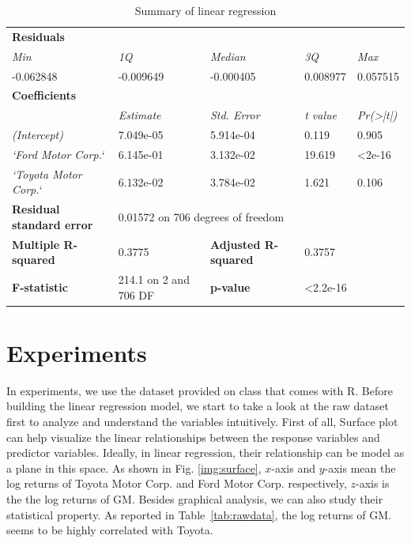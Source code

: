 \begin{table}[t]
\centering
\caption{Summary of linear regression}
\label{tab:lr}
\begin{tabular}{lllll}
\hline
\multicolumn{5}{l}{\textbf{Residuals}} \\
\textit{Min} & \textit{1Q} & \textit{Median} & \textit{3Q} & \textit{Max} \\
-0.062848 & -0.009649 & -0.000405 & 0.008977 & 0.057515 \\ \hline
\multicolumn{5}{l}{\textbf{Coefficients}} \\
 & \textit{Estimate} & \textit{Std. Error} & \textit{t value} & \textit{Pr(\textgreater|t|)} \\
\textit{(Intercept)} & 7.049e-05 & 5.914e-04 & 0.119 & 0.905 \\
\textit{`Ford Motor Corp.`} & 6.145e-01 & 3.132e-02 & 19.619 & \textless2e-16 \\
\textit{`Toyota Motor Corp.`} & 6.132e-02 & 3.784e-02 & 1.621 & 0.106 \\ \hline
\textbf{Residual standard error} & \multicolumn{4}{l}{0.01572 on 706 degrees of freedom} \\
\textbf{Multiple R-squared} & 0.3775 & \textbf{Adjusted R-squared} & \multicolumn{2}{l}{0.3757} \\
\textbf{F-statistic} & 214.1 on 2 and 706 DF & \textbf{p-value} & \multicolumn{2}{l}{\textless 2.2e-16} \\ \hline
\end{tabular}
\end{table}

\section{Experiments}

In experiments, we use the dataset provided on class that comes with R. Before building the linear regression model, we start to take a look at the raw dataset first to analyze and understand the variables intuitively. First of all, Surface plot can help visualize the linear relationships between the response variables and predictor variables. Ideally, in linear regression, their relationship can be model as a plane in this space. As shown in Fig. \ref{img:surface}, $x$-axis and $y$-axis mean the log returns of Toyota Motor Corp. and Ford Motor Corp. respectively, $z$-axis is the the log returns of GM. Besides graphical analysis, we can also study their statistical property. As reported in Table~\ref{tab:rawdata}, the log returns of GM. seems to be highly correlated with Toyota. 

